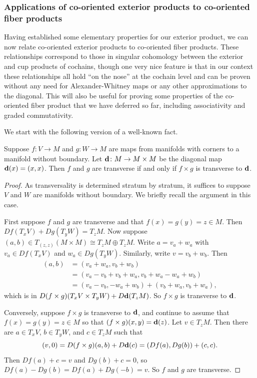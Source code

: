 \subsubsection{Applications of co-oriented exterior products to co-oriented fiber products}\label{S: product relations}

Having established some elementary properties for our exterior product, we can now relate co-oriented exterior products to co-oriented fiber products.
These relationships correspond to those in singular cohomology between the exterior and cup products of cochains, though one very nice feature is that in our context these relationships all hold ``on the nose'' at the cochain level and can be proven without any need for Alexander-Whitney maps or any other approximations to the diagonal.
This will also be useful for proving some properties of the co-oriented fiber product that we have deferred so far, including associativity and graded commutativity.

We start with the following version of a well-known fact.

\begin{lemma}\label{L: alternative transversality}
	Suppose $f \colon V \to M$ and $g \colon W \to M$ are maps from manifolds with corners to a manifold without boundary.
	Let $\mathbf{d} \colon M \to M \times M$ be the diagonal map $\mathbf{d}(x) = (x,x)$.
	Then $f$ and $g$ are transverse if and only if $f \times g$ is transverse to $\mathbf{d}$.
\end{lemma}

\begin{proof}
	As transversality is determined stratum by stratum, it suffices to suppose $V$ and $W$ are manifolds without boundary.
	We briefly recall the argument in this case.

	First suppose $f$ and $g$ are transverse and that $f(x) = g(y) = z \in M$.
	Then $Df(T_xV)+Dg(T_yW) = T_zM$.
	Now suppose $(a,b) \in T_{(z,z)}(M \times M) \cong T_zM \oplus T_zM$.
	Write $a = v_a+w_a$ with $v_a \in Df(T_xV)$ and $w_a \in Dg(T_yW)$.
	Similarly, write $v = v_b+w_b$.
	Then
	\begin{align*}
		(a,b)& = (v_a+w_a,v_b+w_b)\\
		& = (v_a-v_b+v_b+w_a, v_b+w_a-w_a+w_b)\\
		& = (v_a-v_b,-w_a+w_b)+(v_b+w_a, v_b+w_a),
	\end{align*}
	which is in $D(f \times g)(T_xV \times T_yW)+D\mathbf{d}(T_zM)$.
	So $f \times g$ is transverse to $\mathbf{d}$.

	Conversely, suppose $f \times g$ is transverse to $\mathbf{d}$, and continue to assume that $f(x) = g(y) = z \in M$ so that $(f \times g)(x,y) = \mathbf{d}(z)$.
	Let $v \in T_zM$.
	Then there are $a\in T_x V$, $b \in T_y W$, and $c \in T_zM$ such that $$(v,0) = D(f \times g)(a,b) + D\mathbf{d}(c) = (Df(a), Dg(b)) + (c,c).$$
	Then $Df(a) + c = v$ and $Dg(b) + c = 0$, so $Df(a) - Dg(b) = Df(a) + Dg(-b) = v$.
	So $f$ and $g$ are transverse.
\end{proof}

